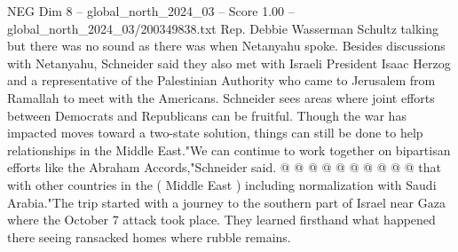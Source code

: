 \begin{textsample}{NEG Dim 8 – global\_north\_2024\_03 – Score 1.00 – global\_north\_2024\_03/200349838.txt}
Rep.
Debbie Wasserman Schultz talking but there was no sound as there was when Netanyahu spoke.
Besides discussions with Netanyahu, Schneider said they also met with Israeli President Isaac Herzog and a representative of the Palestinian Authority who came to Jerusalem from Ramallah to meet with the Americans.
Schneider sees areas where joint efforts between Democrats and Republicans can be fruitful.
Though the war has impacted moves toward a two-state solution, things can still be done to help relationships in the Middle East."We can continue to work together on bipartisan efforts like the Abraham Accords,"Schneider said. @ @ @ @ @ @ @ @ @ @ that with other countries in the ( Middle East ) including normalization with Saudi Arabia."The trip started with a journey to the southern part of Israel near Gaza where the October 7 attack took place.
They learned firsthand what happened there seeing ransacked homes where rubble remains.

\end{textsample}
